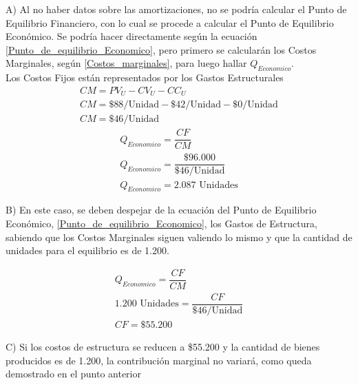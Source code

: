 \documentclass[12pt,a4paper]{article}
\begin{document}
        	A) Al no haber datos sobre las amortizaciones, no se podría calcular el Punto de Equilibrio Financiero, con lo cual se procede a calcular el Punto de Equilibrio Económico. Se podría hacer directamente según la ecuación \ref{Punto_de_equilibrio_Economico}, pero primero se calcularán los Costos Marginales, según \ref{Costos_marginales}, para luego hallar $Q_{Economico}$.\\
            Los Costos Fijos están representados por los Gastos Estructurales
                \begin{gather*}
                	CM	=	{PV}_{U} - {CV}_{U} - {CC}_{U} \\
                    CM	=	\$88 / \text{Unidad} - \$42 / \text{Unidad} - \$0 / \text{Unidad} \\
                    CM	=	\$46 / \text{Unidad}
				\end{gather*}
                \begin{gather*}
                	Q_{Economico} = \dfrac{ CF }{ CM } \\
                    Q_{Economico} = \dfrac{ \$96{.}000 }{ \$46 / \text{Unidad} } \\
                    Q_{Economico} = 2{.}087 \text{ Unidades}
				\end{gather*}
                
			\hrulefill
            
            B) En este caso, se deben despejar de la ecuación del Punto de Equilibrio Económico, \ref{Punto_de_equilibrio_Economico}, los Gastos de Estructura, sabiendo que los Costos Marginales siguen valiendo lo mismo y que la cantidad de unidades para el equilibrio es de 1.200.
            
                \begin{gather*}
                	Q_{Economico} = \dfrac{ CF }{ CM } \\
                    1{.}200 \text{ Unidades} = \dfrac{ CF }{ \$46 / \text{Unidad} } \\
                    CF = \$55{.}200
				\end{gather*}
                
			\newpage
            
            C) Si los costos de estructura se reducen a \$55.200 y la cantidad de bienes producidos es de 1.200, la contribución marginal no variará, como queda demostrado en el punto anterior
        
    
\end{document}
